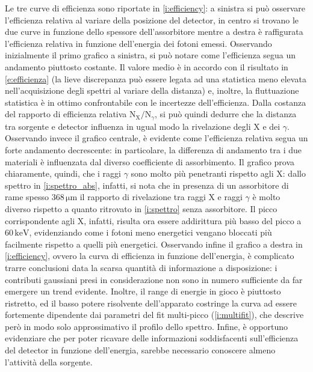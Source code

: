 \documentclass[twocolumn,10pt]{asme2ej}
\begin{document}
Le tre curve di efficienza sono riportate in \autoref{i:efficiency}: a sinistra si può osservare l'efficienza relativa
al variare della posizione del detector, in centro si trovano le due curve in funzione dello spessore dell'assorbitore
mentre a destra è raffigurata l'efficienza relativa in funzione dell'energia dei fotoni emessi. Osservando inizialmente
il primo grafico a sinistra, si può notare come l'efficienza segua un andamento piuttosto costante. Il valore medio è in
accordo con il risultato in \autoref{e:efficienza} (la lieve discrepanza può essere legata ad una statistica meno
elevata nell'acquisizione degli spettri al variare della distanza) e, inoltre, la fluttuazione statistica è in ottimo
confrontabile con le incertezze dell'efficienza. Dalla costanza del rapporto di efficienza relativa
$\text{N}_{\text{X}}/\text{N}_{\gamma}$, si può quindi dedurre che la distanza tra sorgente e detector influenza in
ugual modo la rivelazione degli X e dei $\gamma$. Osservando invece il grafico centrale, è evidente come l'efficienza
relativa segua un forte andamento decrescente: in particolare, la differenza di andamento tra i due materiali è
influenzata dal diverso coefficiente di assorbimento. Il grafico prova chiaramente, quindi, che i raggi $\gamma$ sono
molto più penetranti rispetto agli X: dallo spettro in \autoref{i:spettro_abs}, infatti, si nota che in presenza di un
assorbitore di rame spesso $368\,\si{\micro\metre}$ il rapporto di rivelazione tra raggi X e raggi $\gamma$ è molto
diverso rispetto a quanto ritrovato in \autoref{i:spettro} senza assorbitore. Il picco corrispondente agli X, infatti,
risulta ora essere addirittura più basso del picco a $60\,\si{\kilo\electronvolt}$, evidenziando come i fotoni meno
energetici vengano bloccati più facilmente rispetto a quelli più energetici. Osservando infine il grafico a destra in
\autoref{i:efficiency}, ovvero la curva di efficienza in funzione dell'energia, è complicato trarre conclusioni data la
scarsa quantità di informazione a disposizione: i contributi gaussiani presi in considerazione non sono in numero
sufficiente da far emergere un trend evidente. Inoltre, il range di energie in gioco è piuttosto ristretto, ed il basso
potere risolvente dell'apparato costringe la curva ad essere fortemente dipendente dai parametri del fit multi-picco
(\autoref{i:multifit}), che descrive però in modo solo approssimativo il profilo dello spettro. Infine, è opportuno
evidenziare che per poter ricavare delle informazioni soddisfacenti sull'efficienza del detector in funzione
dell'energia, sarebbe necessario conoscere almeno l'attività della sorgente. 
\end{document}
